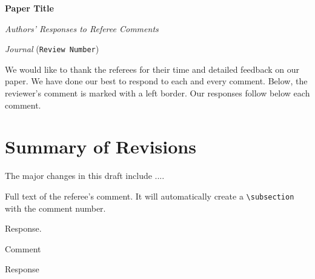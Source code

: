\documentclass[12pt]{article}
\begin{document}
\begin{center}
    {\large\bf Paper Title}
    
    \vspace{1em}

    \emph{Authors' Responses to Referee Comments}

    \vspace{.5em}

    \emph{Journal} (\texttt{Review Number})
    
    \vspace{1em}
\end{center}

\noindent We would like to thank the referees for their time and detailed feedback on our paper. We have done our best to respond to each and every comment. Below, the reviewer's comment is marked with a left border. Our responses follow below each comment.

\section{Summary of Revisions}

The major changes in this draft include ....

\vspace*{\bigskipamount}

\begin{refcomment}
  Full text of the referee's comment. It will automatically create a \texttt{\textbackslash subsection} with the comment number.
  
  \lipsum[1-2]
\end{refcomment}

Response.
\lipsum[3-4]

\begin{refcomment}
  Comment 
\end{refcomment}

Response

\vspace*{\bigskipamount}
\end{document}
